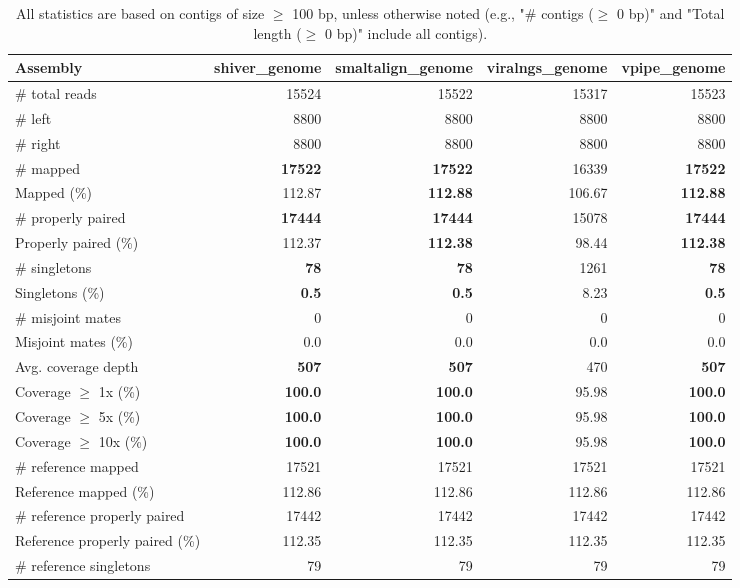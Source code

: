 \documentclass[12pt,a4paper]{article}
\begin{document}
\begin{table}[ht]
\begin{center}
\caption{All statistics are based on contigs of size $\geq$ 100 bp, unless otherwise noted (e.g., "\# contigs ($\geq$ 0 bp)" and "Total length ($\geq$ 0 bp)" include all contigs).}
\begin{tabular}{|l*{4}{|r}|}
\hline
Assembly & shiver\_genome & smaltalign\_genome & viralngs\_genome & vpipe\_genome \\ \hline
\# total reads & 15524 & 15522 & 15317 & 15523 \\ \hline
\# left & 8800 & 8800 & 8800 & 8800 \\ \hline
\# right & 8800 & 8800 & 8800 & 8800 \\ \hline
\# mapped & {\bf 17522} & {\bf 17522} & 16339 & {\bf 17522} \\ \hline
Mapped (\%) & 112.87 & {\bf 112.88} & 106.67 & {\bf 112.88} \\ \hline
\# properly paired & {\bf 17444} & {\bf 17444} & 15078 & {\bf 17444} \\ \hline
Properly paired (\%) & 112.37 & {\bf 112.38} & 98.44 & {\bf 112.38} \\ \hline
\# singletons & {\bf 78} & {\bf 78} & 1261 & {\bf 78} \\ \hline
Singletons (\%) & {\bf 0.5} & {\bf 0.5} & 8.23 & {\bf 0.5} \\ \hline
\# misjoint mates & 0 & 0 & 0 & 0 \\ \hline
Misjoint mates (\%) & 0.0 & 0.0 & 0.0 & 0.0 \\ \hline
Avg. coverage depth & {\bf 507} & {\bf 507} & 470 & {\bf 507} \\ \hline
Coverage $\geq$ 1x (\%) & {\bf 100.0} & {\bf 100.0} & 95.98 & {\bf 100.0} \\ \hline
Coverage $\geq$ 5x (\%) & {\bf 100.0} & {\bf 100.0} & 95.98 & {\bf 100.0} \\ \hline
Coverage $\geq$ 10x (\%) & {\bf 100.0} & {\bf 100.0} & 95.98 & {\bf 100.0} \\ \hline
\# reference mapped & 17521 & 17521 & 17521 & 17521 \\ \hline
Reference mapped (\%) & 112.86 & 112.86 & 112.86 & 112.86 \\ \hline
\# reference properly paired & 17442 & 17442 & 17442 & 17442 \\ \hline
Reference properly paired (\%) & 112.35 & 112.35 & 112.35 & 112.35 \\ \hline
\# reference singletons & 79 & 79 & 79 & 79 \\ \hline

\end{tabular}
\end{center}
\end{table}
\end{document}
